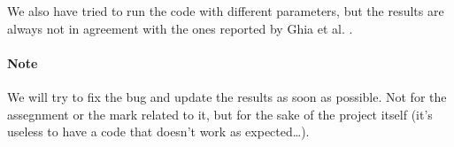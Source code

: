 We also have tried to run the code with different parameters, but the results are always not in agreement with the ones reported by Ghia et al. \cite{Ghia1982HighReSF}.

\paragraph{Note}

We will try to fix the bug and update the results as soon as possible.
Not for the assegnment or the mark related to it, but for the sake of the project itself (it's useless to have a code that doesn't work as expected\dots).
